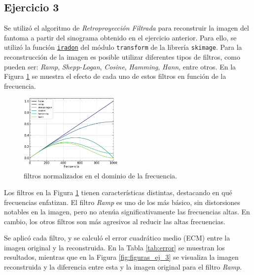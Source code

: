 \documentclass[11pt, twocolumn]{article}
\begin{document}
\subsection*{Ejercicio 3}
Se utilizó el algoritmo de \textit{Retroproyección Filtrada} para reconstruir la imagen del fantoma a partir del sinograma obtenido en el ejercicio anterior. Para ello, se utilizó la función \href{https://scikit-image.org/docs/stable/api/skimage.transform.html#skimage.transform.iradon}{\texttt{iradon}} del módulo \texttt{transform} de la librería \texttt{skimage}. Para la reconstrucción de la imagen es posible utilizar diferentes tipos de filtros, como pueden ser: \textit{Ramp}, \textit{Shepp-Logan}, \textit{Cosine}, \textit{Hamming}, \textit{Hann}, entre otros. En la Figura \ref{fig:filtros} se muestra el efecto de cada uno de estos filtros en función de la frecuencia.

\begin{figure} [htbp]
    \centering
    \includegraphics[width=0.45\textwidth]{images/ej_3/fourier_filters.png}
    \caption{filtros normalizados en el dominio de la frecuencia.}
    \label{fig:filtros}
\end{figure}

Los filtros en la Figura \ref{fig:filtros} tienen características distintas, destacando en qué frecuencias enfatizan. El filtro \textit{Ramp} es uno de los más básico, sin distorsiones notables en la imagen, pero no atenúa significativamente las frecuencias altas. En cambio, los otros filtros son más agresivos al reducir las altas frecuencias.

Se aplicó cada filtro, y se calculó el error cuadrático medio (ECM) entre la imagen original y la reconstruida. En la Tabla \ref{tab:error} se muestran los resultados, mientras que en la Figura \ref{fig:figuras_ej_3} se visualiza la imagen reconstruida y la diferencia entre esta y la imagen original para el filtro \textit{Ramp}.
\end{document}
